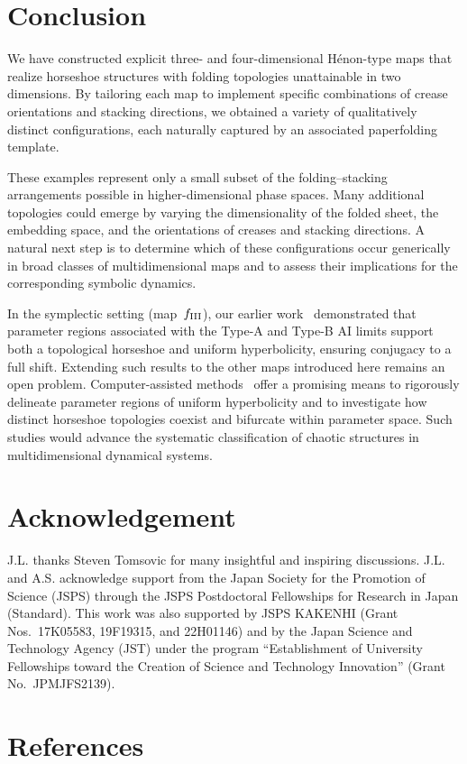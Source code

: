 \documentclass[12pt]{iopart}
\begin{document}
\section{Conclusion}\label{Conclusion}

We have constructed explicit three- and four-dimensional H\'{e}non-type maps that realize horseshoe structures with folding topologies unattainable in two dimensions. By tailoring each map to implement specific combinations of crease orientations and stacking directions, we obtained a variety of qualitatively distinct configurations, each naturally captured by an associated paperfolding template. 

These examples represent only a small subset of the folding–stacking arrangements possible in higher-dimensional phase spaces. Many additional topologies could emerge by varying the dimensionality of the folded sheet, the embedding space, and the orientations of creases and stacking directions. A natural next step is to determine which of these configurations occur generically in broad classes of multidimensional maps and to assess their implications for the corresponding symbolic dynamics.

In the symplectic setting (map~$f_{\rm III}$), our earlier work~\cite{Fujioka25} demonstrated that parameter regions associated with the Type-A and Type-B AI limits support both a topological horseshoe and uniform hyperbolicity, ensuring conjugacy to a full shift. Extending such results to the other maps introduced here remains an open problem. Computer-assisted methods~\cite{arai2007hyperbolic} offer a promising means to rigorously delineate parameter regions of uniform hyperbolicity and to investigate how distinct horseshoe topologies coexist and bifurcate within parameter space. Such studies would advance the systematic classification of chaotic structures in multidimensional dynamical systems.



\section*{Acknowledgement}
J.L. thanks Steven Tomsovic for many insightful and inspiring discussions.
J.L. and A.S. acknowledge support from the Japan Society for the Promotion of Science (JSPS) through the JSPS Postdoctoral Fellowships for Research in Japan (Standard).
This work was also supported by JSPS KAKENHI (Grant Nos.~17K05583, 19F19315, and 22H01146) and by the Japan Science and Technology Agency (JST) under the program “Establishment of University Fellowships toward the Creation of Science and Technology Innovation” (Grant No.~JPMJFS2139).




\section*{References}


\end{document}
